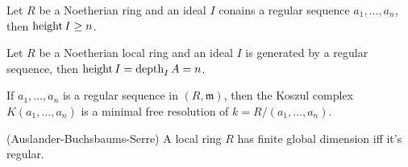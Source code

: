 \begin{lemma}
	\label{lem:depth_leq_ht}
	Let $R$ be a Noetherian ring and an ideal $I$ conains a regular sequence $a_1, \dots, a_n$, then $\operatorname{height} I \geq n$.
\end{lemma}

\begin{corollary}
	\label{lem:depth_eq_ht_if_gen}
	Let $R$ be a Noetherian local ring and an ideal $I$ is generated by a regular sequence, then $\operatorname{height} I = \operatorname{depth}_I A = n$.
\end{corollary}

\begin{corollary}
	\label{cor:koszul_min_resl_residue_iff_reg}
	If $a_1, \dots, a_n$ is a regular sequence in $(R, \mathfrak{m})$, then the Koszul complex $K(a_1, \dots, a_n)$ is a minimal free resolution of $k = R/(a_1, \dots, a_n)$.
\end{corollary}





\begin{theorem} (Auslander-Buchsbaums-Serre)
	\label{thm:loc_ring_reg_iff_fin_globdim}
	A local ring $R$ has finite global dimension iff it's regular.
\end{theorem}
